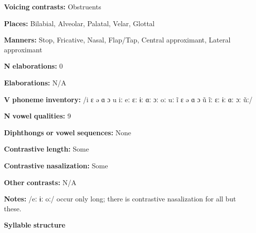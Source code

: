 \documentclass[output=paper]{langsci/langscibook}
\begin{document}
\begin{styleBody}
\textbf{Voicing} \textbf{contrasts:} Obstruents
\end{styleBody}

\begin{styleBody}
\textbf{Places:} Bilabial, Alveolar, Palatal, Velar, Glottal
\end{styleBody}

\begin{styleBody}
\textbf{Manners:} Stop, Fricative, Nasal, Flap/Tap, Central approximant, Lateral approximant
\end{styleBody}

\begin{styleBody}
\textbf{N} \textbf{elaborations:} 0
\end{styleBody}

\begin{styleBody}
\textbf{Elaborations:} N/A
\end{styleBody}

\begin{styleBody}
\textbf{V} \textbf{phoneme} \textbf{inventory:} /i ɛ ə ɑ ɔ u iː eː ɛː ɨː ɑː ɔː oː uː ĩ ɛ ə ɑ ɔ ũ ĩː ɛː ɨː ɑː ɔː ũː/
\end{styleBody}

\begin{styleBody}
\textbf{N} \textbf{vowel} \textbf{qualities:} 9
\end{styleBody}

\begin{styleBody}
\textbf{Diphthongs} \textbf{or} \textbf{vowel} \textbf{sequences:} None
\end{styleBody}

\begin{styleBody}
\textbf{Contrastive} \textbf{length:} Some
\end{styleBody}

\begin{styleBody}
\textbf{Contrastive} \textbf{nasalization:} Some
\end{styleBody}

\begin{styleBody}
\textbf{Other} \textbf{contrasts:} N/A
\end{styleBody}

\begin{styleBody}
\textbf{Notes:} /eː ɨː oː/ occur only long; there is contrastive nasalization for all but these.
\end{styleBody}

\begin{styleBody}
\textbf{Syllable} \textbf{structure}
\end{styleBody}
\end{document}
